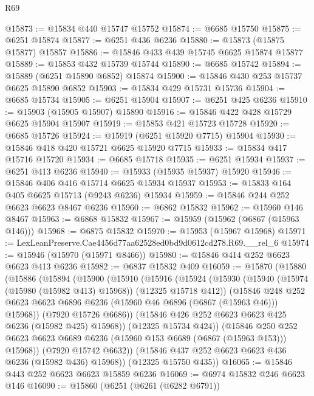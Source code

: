 \begin{lexlean}{R69}
\begin{coremodule}
{@15873 := @15834 @440 @15747 @15752
@15874 := @6685 @15750
@15875 := @6251 @15874
@15877 := @6251 @436 @6236
@15880 := @15873 (@15875 @15877) @15857
@15886 := @15846 @433 @439 @15745 @6625 @15874 @15877
@15889 := @15853 @432 @15739 @15744
@15890 := @6685 @15742
@15894 := @15889 (@6251 @15890 @6852) @15874
@15900 := @15846 @430 @253 @15737 @6625 @15890 @6852
@15903 := @15834 @429 @15731 @15736
@15904 := @6685 @15734
@15905 := @6251 @15904
@15907 := @6251 @425 @6236
@15910 := @15903 (@15905 @15907) @15890
@15916 := @15846 @422 @428 @15729 @6625 @15904 @15907
@15919 := @15853 @421 @15723 @15728
@15920 := @6685 @15726
@15924 := @15919 (@6251 @15920 @7715) @15904
@15930 := @15846 @418 @420 @15721 @6625 @15920 @7715
@15933 := @15834 @417 @15716 @15720
@15934 := @6685 @15718
@15935 := @6251 @15934
@15937 := @6251 @413 @6236
@15940 := @15933 (@15935 @15937) @15920
@15946 := @15846 @406 @416 @15714 @6625 @15934 @15937
@15953 := @15833 @164 @405 @6625 @15713 (@9243 @6236) @15934
@15959 := @15846 @244 @252 @6623 @6623 @8467 @6236
@15960 := @6862 @15832
@15962 := @15960 @146 @8467
@15963 := @6868 @15832
@15967 := @15959 (@15962 (@6867 (@15963 @146)))
@15968 := @6875 @15832
@15970 := @15953 (@15967 @15968)
@15971 := LexLeanPreserve.Cae4456d77aa62528ed0bd9d0612cd278.R69.__rel_6
@15974 := @15946 (@15970 (@15971 @8466))
@15980 := @15846 @414 @252 @6623 @6623 @413 @6236
@15982 := @6837 @15832 @409
@16059 := @15870
    (@15880
      (@15886
        (@15894
          (@15900
            (@15910
              (@15916
                (@15924
                  (@15930
                    (@15940 (@15974 (@15980 (@15982 @413) @15968)) (@12325 @15718 @412))
                    (@15846
                      @248
                      @252
                      @6623
                      @6623
                      @6896
                      @6236
                      (@15960 @46 @6896 (@6867 (@15963 @46)))
                      @15968))
                  (@7920 @15726 @6686))
                (@15846 @426 @252 @6623 @6623 @425 @6236 (@15982 @425) @15968))
              (@12325 @15734 @424))
            (@15846
              @250
              @252
              @6623
              @6623
              @6689
              @6236
              (@15960 @153 @6689 (@6867 (@15963 @153)))
              @15968))
          (@7920 @15742 @6632))
        (@15846 @437 @252 @6623 @6623 @436 @6236 (@15982 @436) @15968))
      (@12325 @15750 @435))
@16065 := @15846 @443 @252 @6623 @6623 @15859 @6236
@16069 := @6974 @15832 @246 @6623 @146
@16090 := @15860
    (@6251
      (@6261 (@6282 @6791))
}
\end{coremodule}
\end{lexlean}
